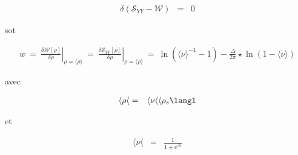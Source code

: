 \begin{eqnarray*}
	\delta (\mathcal{S}_{YY} - \mathcal{W}) & = & 0  	
\end{eqnarray*}

sot 


\begin{eqnarray*}
	w ~=~ \left. \frac{\delta \mathcal{W}[\rho]}{\delta \rho} \right|_{\rho = \langle \rho \rangle } ~= ~\left. \frac{\delta \mathcal{S}_{YY}[\rho]}{\delta \rho} \right|_{\rho = \langle \rho \rangle } ~=~ \ln ( \langle \nu \rangle^{-1}  - 1 ) - \frac{\Delta}{2\pi} \star \ln ( 1 -  \langle \nu \rangle )
\end{eqnarray*}

avec  

\begin{eqnarray*}
	\langle \rho \langle &  =  &\langle \nu \langle\langle \rho_s \langl	
\end{eqnarray*}

et 

\begin{eqnarray*}
	\langle \nu \langle & = & \frac{1}{1 + e^{\beta \epsilon}} 		
\end{eqnarray*}







